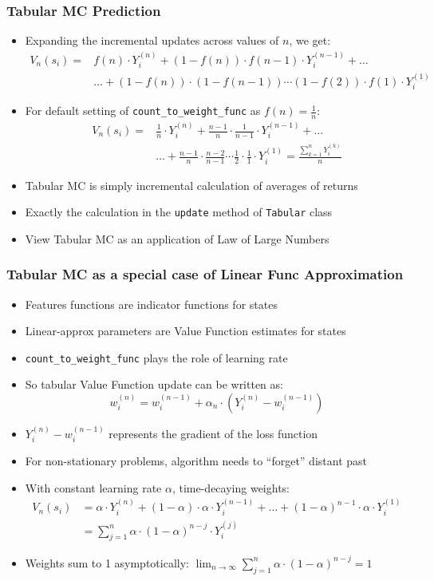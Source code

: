 \documentclass[handout]{beamer}
\begin{document}
\begin{frame}
\frametitle{Tabular MC Prediction}
\pause
\begin{itemize}[<+->]
\item Expanding the incremental updates across values of $n$, we get:
\begin{align*}
V_n(s_i) = & f(n) \cdot Y^{(n)}_i + (1 - f(n)) \cdot f(n-1) \cdot Y^{(n-1)}_i + \ldots \\
& \ldots + (1-f(n)) \cdot (1-f(n-1)) \cdots (1-f(2)) \cdot f(1) \cdot Y^{(1)}_i
\end{align*}
\item For default setting of \lstinline{count_to_weight_func} as $f(n) = \frac 1 n$:
\begin{align*}
V_n(s_i) = & \frac 1 n \cdot Y^{(n)}_i + \frac {n-1} n\cdot \frac 1 {n-1} \cdot Y^{(n-1)}_i + \ldots \\
& \ldots + \frac {n-1} n \cdot \frac {n-2} {n-1} \cdots \frac 1 2 \cdot \frac 1 1 \cdot Y^{(1)}_i  = \frac {\sum_{k=1}^n Y^{(k)}_i} n
\end{align*}
\item Tabular MC is simply incremental calculation of averages of returns
\item Exactly the calculation in the \lstinline{update} method of \lstinline{Tabular} class
\item View Tabular MC as an application of Law of Large Numbers
\end{itemize}
\end{frame}

\begin{frame}
\frametitle{Tabular MC as a special case of Linear Func Approximation}
\pause
\begin{itemize}[<+->]
\item Features functions are indicator functions for states
\item Linear-approx parameters are Value Function estimates for states
\item \lstinline{count_to_weight_func} plays the role of learning rate
\item So tabular Value Function update can be written as:
$$w^{(n)}_i = w^{(n-1)}_i + \alpha_n \cdot (Y^{(n)}_i - w^{(n-1)}_i)$$
\item $Y^{(n)}_i - w^{(n-1)}_i$ represents the gradient of the loss function
\item For non-stationary problems, algorithm needs to ``forget'' distant past
\item With constant learning rate $\alpha$, time-decaying weights:
\begin{align*}
V_n(s_i) & = \alpha \cdot Y^{(n)}_i + (1 - \alpha) \cdot \alpha \cdot Y^{(n-1)}_i + \ldots + (1-\alpha)^{n-1} \cdot \alpha \cdot Y^{(1)}_i \\
& = \sum_{j=1}^n \alpha \cdot (1 - \alpha)^{n-j} \cdot Y^{(j)}_i
\end{align*}
\item Weights sum to 1 asymptotically: $\lim_{n\rightarrow \infty} \sum_{j=1}^n \alpha \cdot (1 - \alpha)^{n-j} = 1$
\end{itemize}
\end{frame}
\end{document}

